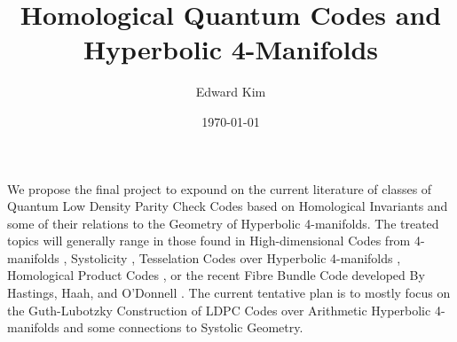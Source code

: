 \documentclass[12pt]{article}%
\begin{document}
\title{Homological Quantum Codes and Hyperbolic 4-Manifolds}
\author{Edward Kim}
\date{\today}
\maketitle

We propose the final project to expound on the current literature of classes of Quantum Low Density Parity Check Codes \cite{breuckmann2021quantum} based on Homological Invariants and some of their relations to the Geometry of Hyperbolic 4-manifolds. The treated topics will generally range in those found in High-dimensional Codes from 4-manifolds \cite{guth2014quantum, hastings2016quantum}, Systolicity \cite{fetaya2011homological, freedman2002z2}, Tesselation Codes over Hyperbolic 4-manifolds \cite{londe2017golden, breuckmann2017homological}, Homological Product Codes \cite{bravyi2014homological, delfosse2021union}, or the recent Fibre Bundle Code developed By Hastings, Haah, and O'Donnell \cite{hastings2021fiber}. The current tentative plan is to mostly focus on the Guth-Lubotzky Construction of LDPC Codes over Arithmetic Hyperbolic 4-manifolds and some connections to Systolic Geometry. 

\nocite{*}


\end{document}
